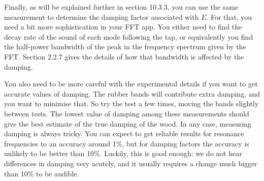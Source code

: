   Finally, as will be explained further in section 10.3.3, you can use the same 
  measurement to determine the damping factor associated with $E$. For that, 
  you need a bit more sophistication in your FFT app. You either need to find 
  the decay rate of the sound of each mode following the tap, or equivalently 
  you find the half-power bandwidth of the peak in the frequency spectrum given 
  by the FFT. Section 2.2.7 gives the details of how that bandwidth is affected 
  by the damping. 

  You also need to be more careful with the experimental details if you want to 
  get accurate values of damping. The rubber bands will contribute extra 
  damping, and you want to minimise that. So try the test a few times, moving 
  the bands slightly between tests. The lowest value of damping among these 
  measurements should give the best estimate of the true damping of the wood. 
  In any case, measuring damping is always tricky. You can expect to get 
  reliable results for resonance frequencies to an accuracy around 1\%, but for 
  damping factors the accuracy is unlikely to be better than 10\%. Luckily, 
  this is good enough: we do not hear differences in damping very acutely, and 
  it usually requires a change much bigger than 10\% to be audible. 